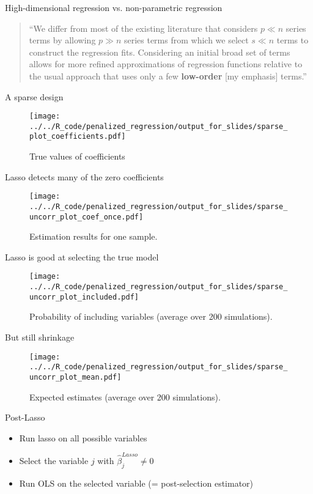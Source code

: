 \documentclass[xcolor=dvipsnames, handout]{beamer}
\begin{document}
\begin{frame}{High-dimensional regression vs. non-parametric regression}
\begin{quote}
  ``We differ from most of the existing literature that considers $p \ll n$ series terms by allowing $p \gg n$ series terms from which we select $s \ll n$ terms to construct the regression fits. Considering an initial broad set of terms allows for more refined approximations of regression functions relative to the usual approach that uses only a few \textbf{low-order} [my emphasis] terms.''\parencite{belloni2014inference}
\end{quote}
\end{frame}


\begin{frame}{A sparse design}
\begin{figure}
  \texttt{[image: ../../R\_code/penalized\_regression/output\_for\_slides/sparse\_plot\_coefficients.pdf]}
   \caption{True values of coefficients}
\end{figure}
\end{frame}

\begin{frame}{Lasso detects many of the zero coefficients}
\begin{figure}
  \texttt{[image: ../../R\_code/penalized\_regression/output\_for\_slides/sparse\_uncorr\_plot\_coef\_once.pdf]}
   \caption{Estimation results for one sample.}
\end{figure}
\end{frame}

\begin{frame}{Lasso is good at selecting the true model}
\begin{figure}
  \texttt{[image: ../../R\_code/penalized\_regression/output\_for\_slides/sparse\_uncorr\_plot\_included.pdf]}
   \caption{Probability of including variables (average over 200 simulations).}
\end{figure}
\end{frame}

\begin{frame}{But still shrinkage}
\begin{figure}
  \texttt{[image: ../../R\_code/penalized\_regression/output\_for\_slides/sparse\_uncorr\_plot\_mean.pdf]}
   \caption{Expected estimates (average over 200 simulations).}
\end{figure}
\end{frame}

\begin{frame}{Post-Lasso}
\begin{itemize}
  \item Run lasso on all possible variables 
  \item Select the variable $j$ with $\hat{\beta}_j^{Lasso} \neq 0$
  \item Run OLS on the selected variable (= post-selection estimator)
\end{itemize}
\end{frame}
\end{document}
